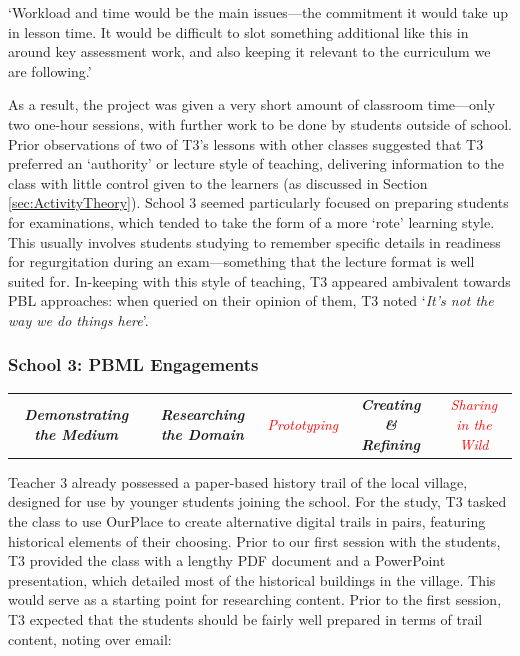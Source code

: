 \begin{displayquote}
`Workload and time would be the main issues---the commitment it would take up in lesson time. It would be difficult to slot something additional like this in around key assessment work, and also keeping it relevant to the curriculum we are following.'
\end{displayquote}

As a result, the project was given a very short amount of classroom time---only two one-hour sessions, with further work to be done by students outside of school. Prior observations of two of T3's lessons with other classes suggested that T3 preferred an `authority' or lecture style of teaching, delivering information to the class with little control given to the learners (as discussed in Section \ref{sec:ActivityTheory}). School 3 seemed particularly focused on preparing students for examinations, which tended to take the form of a more `rote' learning style. This usually involves students studying to remember specific details in readiness for regurgitation during an exam---something that the lecture format is well suited for. In-keeping with this style of teaching, T3 appeared ambivalent towards PBL approaches: when queried on their opinion of them, T3 noted `\textit{It's not the way we do things here}'.

\subsubsection{School 3: PBML Engagements}

\begin{table}[h]
    \centering
    \begin{tabulary}{\textwidth}{C|C|p{19mm}|C|C}
    \small\textit{\textbf{Demonstrating the Medium}} 
    & \small\textit{\textbf{Researching the Domain}}
    & \small\textit{\textcolor{red}{Prototyping}}
    & \small\textit{\textbf{Creating \& Refining}}
    & \small\textit{\textcolor{red}{Sharing in the Wild}}\\
\end{tabulary}
\end{table}

Teacher 3 already possessed a paper-based history trail of the local village, designed for use by younger students joining the school. For the study, T3 tasked the class to use OurPlace to create alternative digital trails in pairs, featuring historical elements of their choosing. Prior to our first session with the students, T3 provided the class with a lengthy PDF document and a PowerPoint presentation, which detailed most of the historical buildings in the village. This would serve as a starting point for researching content. Prior to the first session, T3 expected that the students should be fairly well prepared in terms of trail content, noting over email: 

